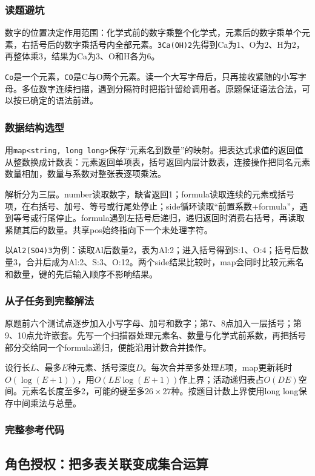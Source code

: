 \subsubsection{读题避坑}
数字的位置决定作用范围：化学式前的数字乘整个化学式，元素后的数字乘单个元素，右括号后的数字乘括号内全部元素。\texttt{3Ca(OH)2}先得到Ca为1、O为2、H为2，再整体乘3，结果为Ca为3、O和H各为6。

\texttt{Co}是一个元素，\texttt{CO}是C与O两个元素。读一个大写字母后，只再接收紧随的小写字母。多位数字连续扫描，遇到分隔符时把指针留给调用者。原题保证语法合法，可以按已确定的语法前进。

\subsubsection{数据结构选型}
用\texttt{map<string, long long>}保存“元素名到数量”的映射。把表达式求值的返回值从整数换成计数表：元素返回单项表，括号返回内层计数表，连接操作把同名元素数量相加，数量与系数对整张表逐项乘法。

解析分为三层。number读取数字，缺省返回1；formula读取连续的元素或括号项，在右括号、加号、等号或行尾处停止；side循环读取“前置系数+formula”，遇到等号或行尾停止。formula遇到左括号后递归，递归返回时消费右括号，再读取紧随其后的数量。共享pos始终指向下一个未处理字符。

以\texttt{Al2(SO4)3}为例：读取Al后数量2，表为Al:2；进入括号得到S:1、O:4；括号后数量3，合并后成为Al:2、S:3、O:12。两个side结果比较时，map会同时比较元素名和数量，键的先后输入顺序不影响结果。

\subsubsection{从子任务到完整解法}
原题前六个测试点逐步加入小写字母、加号和数字；第7、8点加入一层括号；第9、10点允许嵌套。先写一个扫描器处理元素名、数量与化学式前系数，再把括号部分交给同一个formula递归，便能沿用计数合并操作。

设行长$L$、最多$E$种元素、括号深度$D$。每次合并至多处理$E$项，map更新耗时$O(\log(E+1))$，用$O(LE\log(E+1))$作上界；活动递归表占$O(DE)$空间。元素名长度至多2，可能的键至多$26\times27$种。按题目计数上界使用long long保存中间乘法与总量。

\subsubsection{完整参考代码}

\subsection{角色授权：把多表关联变成集合运算}
